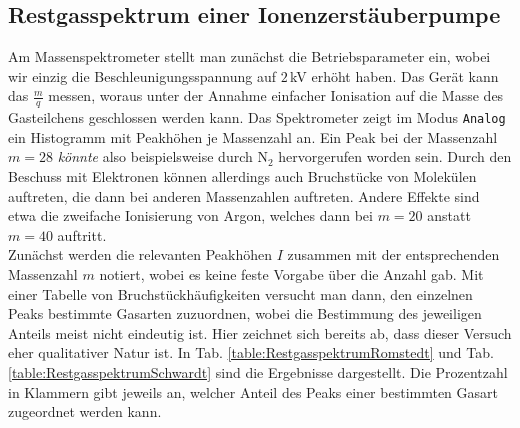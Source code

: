 \documentclass[german, parskip=full]{scrartcl}
\newcommand{\tecxt}{}
\begin{document}
\subsection{Restgasspektrum einer Ionenzerstäuberpumpe}
Am Massenspektrometer stellt man zunächst die Betriebsparameter ein, wobei wir einzig die Beschleunigungsspannung auf $2\,$kV erhöht haben. Das Gerät kann das $\frac{m}{q}$ messen, woraus unter der Annahme einfacher Ionisation auf die Masse des Gasteilchens geschlossen werden kann. Das Spektrometer zeigt im Modus \texttt{Analog} ein Histogramm mit Peakhöhen je Massenzahl an. Ein Peak bei der Massenzahl $m=28$ \emph{könnte} also beispielsweise durch $\tecxt\text{N}_2$ hervorgerufen worden sein. Durch den Beschuss mit Elektronen können allerdings auch Bruchstücke von Molekülen auftreten, die dann bei anderen Massenzahlen auftreten. Andere Effekte sind etwa die zweifache Ionisierung von Argon, welches dann bei $m=20$ anstatt $m=40$ auftritt.\\
Zunächst werden die relevanten Peakhöhen $I$ zusammen mit der entsprechenden Massenzahl $m$ notiert, wobei es keine feste Vorgabe über die Anzahl gab. Mit einer Tabelle von Bruchstückhäufigkeiten versucht man dann, den einzelnen Peaks bestimmte Gasarten zuzuordnen, wobei die Bestimmung des jeweiligen Anteils meist nicht eindeutig ist. Hier zeichnet sich bereits ab, dass dieser Versuch eher qualitativer Natur ist. In Tab. \ref{table:RestgasspektrumRomstedt} und Tab. \ref{table:RestgasspektrumSchwardt} sind die Ergebnisse dargestellt. Die Prozentzahl in Klammern gibt jeweils an, welcher Anteil des Peaks einer bestimmten Gasart zugeordnet werden kann.
\end{document}
